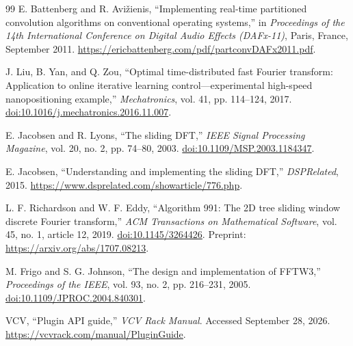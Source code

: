 \documentclass[11pt,letterpaper]{article}
\begin{document}
\begin{thebibliography}{99}
E. Battenberg and R. Avi\v{z}ienis, ``Implementing real-time partitioned
convolution algorithms on conventional operating systems,'' in
\emph{Proceedings of the 14th International Conference on Digital Audio
Effects (DAFx-11)}, Paris, France, September 2011.
\url{https://ericbattenberg.com/pdf/partconvDAFx2011.pdf}.

J. Liu, B. Yan, and Q. Zou, ``Optimal time-distributed fast Fourier transform:
Application to online iterative learning control---experimental high-speed
nanopositioning example,'' \emph{Mechatronics}, vol. 41, pp. 114--124, 2017.
\href{https://doi.org/10.1016/j.mechatronics.2016.11.007}{doi:10.1016/j.mechatronics.2016.11.007}.

E. Jacobsen and R. Lyons, ``The sliding DFT,'' \emph{IEEE Signal Processing
Magazine}, vol. 20, no. 2, pp. 74--80, 2003.
\href{https://doi.org/10.1109/MSP.2003.1184347}{doi:10.1109/MSP.2003.1184347}.

E. Jacobsen, ``Understanding and implementing the sliding DFT,''
\emph{DSPRelated}, 2015.
\url{https://www.dsprelated.com/showarticle/776.php}.

L. F. Richardson and W. F. Eddy, ``Algorithm 991: The 2D tree sliding window
discrete Fourier transform,'' \emph{ACM Transactions on Mathematical Software},
vol. 45, no. 1, article 12, 2019.
\href{https://doi.org/10.1145/3264426}{doi:10.1145/3264426}.
Preprint: \url{https://arxiv.org/abs/1707.08213}.

M. Frigo and S. G. Johnson, ``The design and implementation of FFTW3,''
\emph{Proceedings of the IEEE}, vol. 93, no. 2, pp. 216--231, 2005.
\href{https://doi.org/10.1109/JPROC.2004.840301}{doi:10.1109/JPROC.2004.840301}.

VCV, ``Plugin API guide,'' \emph{VCV Rack Manual}. Accessed September 28, 2026.
\url{https://vcvrack.com/manual/PluginGuide}.
\end{thebibliography}
\end{document}
